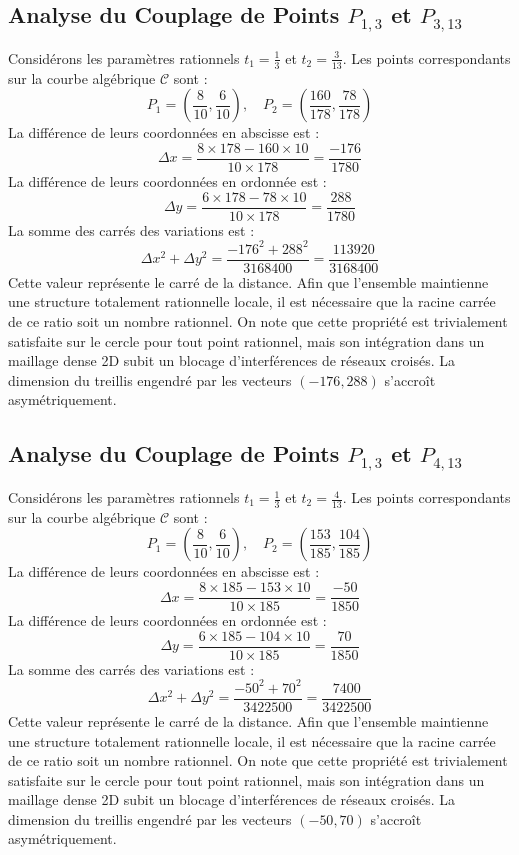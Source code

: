 \documentclass[12pt, a4paper]{article}
\begin{document}
\subsection{Analyse du Couplage de Points $P_{1,3}$ et $P_{3,13}$}
Considérons les paramètres rationnels $t_1 = \frac{1}{3}$ et $t_2 = \frac{3}{13}$.
Les points correspondants sur la courbe algébrique $\mathcal{C}$ sont :
$$ P_1 = \left( \frac{8}{10}, \frac{6}{10} \right), \quad P_2 = \left( \frac{160}{178}, \frac{78}{178} \right) $$
La différence de leurs coordonnées en abscisse est :
$$ \Delta x = \frac{8 \times 178 - 160 \times 10}{10 \times 178} = \frac{-176}{1780} $$
La différence de leurs coordonnées en ordonnée est :
$$ \Delta y = \frac{6 \times 178 - 78 \times 10}{10 \times 178} = \frac{288}{1780} $$
La somme des carrés des variations est :
$$ \Delta x^2 + \Delta y^2 = \frac{ -176^2 + 288^2 }{ 3168400 } = \frac{ 113920 }{ 3168400 } $$
Cette valeur représente le carré de la distance. Afin que l'ensemble maintienne une structure totalement rationnelle locale, il est nécessaire que la racine carrée de ce ratio soit un nombre rationnel. On note que cette propriété est trivialement satisfaite sur le cercle pour tout point rationnel, mais son intégration dans un maillage dense 2D subit un blocage d'interférences de réseaux croisés. La dimension du treillis engendré par les vecteurs $( -176, 288 )$ s'accroît asymétriquement.


\subsection{Analyse du Couplage de Points $P_{1,3}$ et $P_{4,13}$}
Considérons les paramètres rationnels $t_1 = \frac{1}{3}$ et $t_2 = \frac{4}{13}$.
Les points correspondants sur la courbe algébrique $\mathcal{C}$ sont :
$$ P_1 = \left( \frac{8}{10}, \frac{6}{10} \right), \quad P_2 = \left( \frac{153}{185}, \frac{104}{185} \right) $$
La différence de leurs coordonnées en abscisse est :
$$ \Delta x = \frac{8 \times 185 - 153 \times 10}{10 \times 185} = \frac{-50}{1850} $$
La différence de leurs coordonnées en ordonnée est :
$$ \Delta y = \frac{6 \times 185 - 104 \times 10}{10 \times 185} = \frac{70}{1850} $$
La somme des carrés des variations est :
$$ \Delta x^2 + \Delta y^2 = \frac{ -50^2 + 70^2 }{ 3422500 } = \frac{ 7400 }{ 3422500 } $$
Cette valeur représente le carré de la distance. Afin que l'ensemble maintienne une structure totalement rationnelle locale, il est nécessaire que la racine carrée de ce ratio soit un nombre rationnel. On note que cette propriété est trivialement satisfaite sur le cercle pour tout point rationnel, mais son intégration dans un maillage dense 2D subit un blocage d'interférences de réseaux croisés. La dimension du treillis engendré par les vecteurs $( -50, 70 )$ s'accroît asymétriquement.
\end{document}
